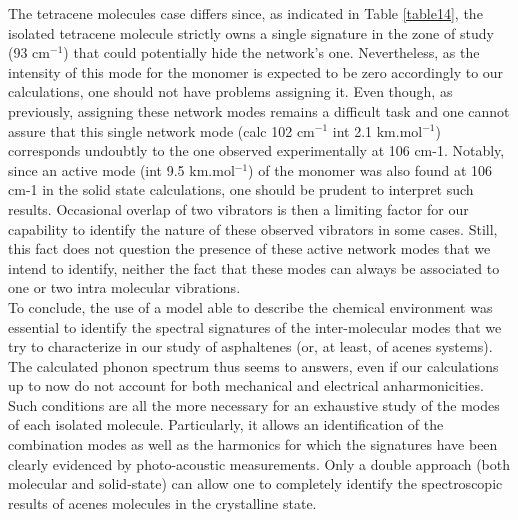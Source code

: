 The tetracene molecules case differs since, as indicated in Table \ref{table14}, the isolated tetracene molecule strictly owns a single signature in the zone of study (93 cm$^{-1}$) that could potentially hide the network’s one. Nevertheless, as the intensity of this mode for the monomer is expected to be zero accordingly to our calculations, one should not have problems assigning it. Even though, as previously, assigning these network modes remains a difficult task and one cannot assure that this single network mode (calc 102 cm$^{-1}$ int 2.1 km.mol$^{-1}$) corresponds undoubtly to the one observed experimentally at 106 cm-1. Notably, since an active mode (int 9.5 km.mol$^{-1}$) of the monomer was also found at 106 cm-1 in the solid state calculations, one should be prudent to interpret such results. Occasional overlap of two vibrators is then a limiting factor for our capability to identify the nature of these observed vibrators in some cases. Still, this fact does not question the presence of these active network modes that we intend to identify, neither the fact that these modes can always be associated to one or two intra molecular vibrations. \\

 
 To conclude, the use of a model able to describe the chemical environment was essential to identify the spectral signatures of the inter-molecular modes that we try to characterize in our study of asphaltenes (or, at least, of acenes systems). The calculated phonon spectrum thus seems to answers, even if our calculations up to now do not account for both mechanical and electrical anharmonicities. Such conditions are all the more necessary for an exhaustive study of the modes of each isolated molecule. Particularly, it allows an identification of the combination modes as well as the harmonics for which the signatures have been clearly evidenced by photo-acoustic measurements. Only a double approach (both molecular and solid-state) can allow one to completely identify the spectroscopic results of acenes molecules in the crystalline state.
 
